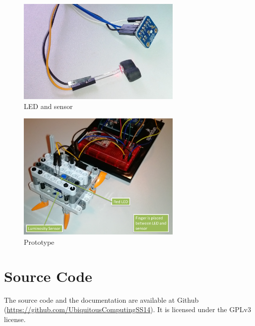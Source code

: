 \documentclass[notitlepage]{scrreprt}
\begin{document}
\begin{figure}[H]
	\centering
	\includegraphics[width=300px]{images/ledAndSensor.jpg}
	\caption{LED and sensor}
	\label{fig:led-sensor}
\end{figure}

\begin{figure}[H]
	\centering
	\includegraphics[width=300px]{images/prototype_labeled.png}
	\caption{Prototype}
	\label{fig:prototype}
\end{figure}

\section{Source Code}
The source code and the documentation are available at Github (\url{https://github.com/UbiquitousComputingSS14}). It is licensed under the GPLv3 license.
\end{document}
